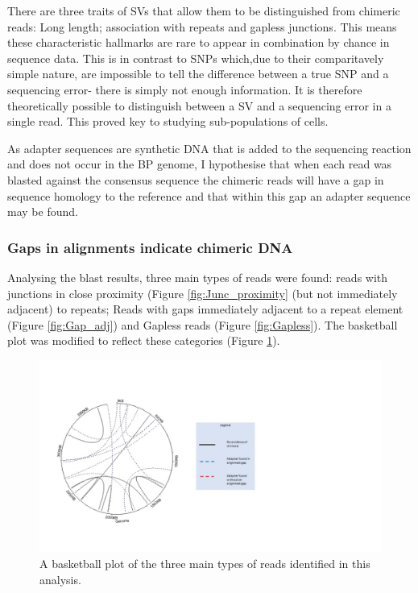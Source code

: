 \documentclass{article}
\begin{document}
There are three traits of SVs that allow them to be distinguished from chimeric reads: Long length; association with repeats and gapless junctions. This means these characteristic hallmarks are rare to appear in combination by chance in sequence data. This is in contrast to SNPs which,due to their comparitavely simple nature, are  impossible to tell the difference between a true SNP and a sequencing error- there is simply not enough information.  It is therefore theoretically possible to distinguish between a SV and a sequencing error in a single read. This proved key to studying sub-populations of cells. 
 
As adapter sequences are synthetic DNA that is added to the sequencing reaction and does not occur in the BP genome, I hypothesise that when each read was blasted against the consensus sequence the chimeric reads will have a gap in sequence homology to the reference and that within this gap an adapter sequence may be found.

\subsubsection{Gaps in alignments indicate chimeric DNA}
Analysing the blast results, three main types of reads were found: reads with junctions in close proximity (Figure \ref{fig:Junc_proximity} (but not immediately adjacent) to repeats; Reads with gaps immediately adjacent to a repeat element (Figure \ref{fig:Gap_adj}) and Gapless reads (Figure \ref{fig:Gapless}). The basketball plot was modified to reflect these categories (Figure \ref{fig:Basketball_3_errors}).

\begin{figure}[h!]
\centering
\includegraphics[width=\textwidth{}]{Chapter_2/baskey [Autosaved].jpg}
\caption{A basketball plot of the three main types of reads identified in this analysis. }
\label{fig:Basketball_3_errors}
\end{figure}
\end{document}
